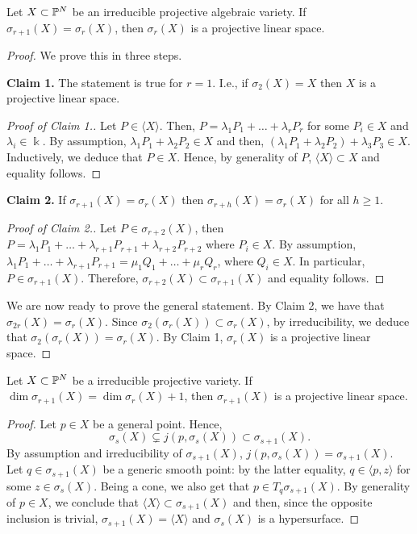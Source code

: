 \begin{lemma}
    \label{geometrySecants-lemma-palatini_1}
    Let $X\subset \mathbb{P}^N$ be an irreducible projective algebraic variety. If $\sigma_{r+1}(X) = \sigma_r(X)$, then $\sigma_r(X)$ is a projective linear space. 
\end{lemma}
\begin{proof}
    We prove this in three steps.

    {\bf Claim 1.} The statement is true for $r = 1$. I.e., if $\sigma_2(X) = X$ then $X$ is a projective linear space.
    \begin{proof}[Proof of Claim 1.]
        Let $P \in \langle X \rangle$. Then, $P = \lambda_1P_1 + \ldots + \lambda_rP_r$ for some $P_i \in X$ and $\lambda_i \in \Bbbk$. By assumption, $\lambda_1P_1 + \lambda_2P_2 \in X$ and then, $(\lambda_1P_1 + \lambda_2P_2) + \lambda_3P_3 \in X$. Inductively, we deduce that $P \in X$. Hence, by generality of $P$, $\langle X \rangle \subset X$ and equality follows. 
    \end{proof}

    {\bf Claim 2.} If $\sigma_{r+1}(X) = \sigma_r(X)$ then $\sigma_{r+h}(X) = \sigma_r(X)$ for all $h \geq 1$. 
    \begin{proof}[Proof of Claim 2.]
        Let $P \in \sigma_{r+2}(X)$, then $P = \lambda_1P_1 + \ldots + \lambda_{r+1}P_{r+1} + \lambda_{r+2}P_{r+2}$ where $P_i \in X$. By assumption, $\lambda_1P_1 + \ldots + \lambda_{r+1}P_{r+1} = \mu_1Q_1 + \ldots + \mu_rQ_r$, where $Q_i \in X$. In particular, $P \in \sigma_{r+1}(X)$. Therefore, $\sigma_{r+2}(X) \subset \sigma_{r+1}(X)$ and equality follows. 
    \end{proof}

    We are now ready to prove the general statement. By Claim 2, we have that $\sigma_{2r}(X) = \sigma_r(X)$. Since $\sigma_2(\sigma_r(X)) \subset \sigma_r(X)$, by irreducibility, we deduce that $\sigma_2(\sigma_r(X)) = \sigma_r(X)$. By Claim 1, $\sigma_r(X)$ is a projective linear space. 
\end{proof}


\begin{lemma}
    \label{geometrySecants-lemma-palatini_2}
Let $X\subset \mathbb{P}^N$ be a irreducible projective variety. If $\dim\sigma_{r+1}(X) = \dim\sigma_r(X)+1$, then $\sigma_{r+1}(X)$ is a projective linear space. 
\end{lemma}
\begin{proof}
    Let $p \in X$ be a general point. Hence,
    \[
        \sigma_s(X) \subsetneq j(p, \sigma_s(X)) \subset \sigma_{s+1}(X).  
    \]
    By assumption and irreducibility of $\sigma_{s+1}(X)$, $j(p, \sigma_s(X)) = \sigma_{s+1}(X)$. Let $q \in \sigma_{s+1}(X)$ be a generic smooth point: by the latter equality, $q \in \langle p,z \rangle$ for some $z \in \sigma_s(X)$. Being a cone, we also get that $p \in T_q\sigma_{s+1}(X)$. By generality of $p \in X$, we conclude that $\langle X \rangle \subset \sigma_{s+1}(X)$ and then, since the opposite inclusion is trivial, $\sigma_{s+1}(X) = \langle X \rangle$ and $\sigma_s(X)$ is a hypersurface. 
\end{proof}


